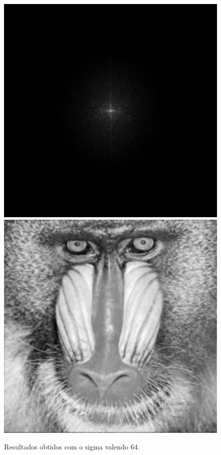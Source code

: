 \documentclass[twoside,twocolumn]{article}
\begin{document}
\begin{figure}[H]
\begin{center}
	\includegraphics[scale=.17]{figures/baboon_mag_filter_64.png}
	\includegraphics[scale=.17]{figures/baboon_result_64.png}
\caption{Resultados obtidos com o sigma valendo 64.} \label{mag_64}
\end{center}
\end{figure}
\end{document}
